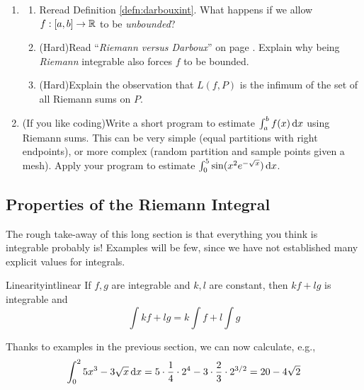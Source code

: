 \begin{exercises}
\begin{enumerate}
		\item\begin{enumerate}
		  \item Reread Definition \ref{defn:darbouxint}. What happens if we allow $f:[a,b]\to\mathbb{R}$ to be \emph{unbounded}?
		  \item (Hard)\lstsp Read ``\emph{Riemann versus Darboux}'' on page \pageref{pg:riemanndefthm}. Explain why being \emph{Riemann} integrable also forces $f$ to be bounded.
		  \item (Hard)\lstsp Explain the observation that $L(f,P)$ is the infimum of the set of all Riemann sums on $P$.
		\end{enumerate}
	
		\item (If you like coding)\quad Write a short program to estimate $\int_a^bf(x)\,{\mathrm{d} x}$ using Riemann sums. This can be very simple (equal partitions with right endpoints), or more complex (random partition and sample points given a mesh). Apply your program to estimate $\int_0^{5}\sin(x^2e^{-\sqrt x})\,{\mathrm{d} x}$.
	\end{enumerate}
\end{exercises}



\clearpage



\subsection{Properties of the Riemann Integral}\label{sec:riemannproperties}

The rough take-away of this long section is that everything you think is integrable probably is! Examples will be few, since we have not established many explicit values for integrals.


\begin{thm}{Linearity}{intlinear}
	If $f,g$ are integrable and $k,l$ are constant, then $kf+lg$ is integrable and
	\[
		\int  kf+lg=k\int f+l\int g
	\]
\end{thm}

\begin{example}{}{}
Thanks to examples in the previous section, we can now calculate, e.g.,
\[
	\int_0^25x^3-3\sqrt x\,{\mathrm{d} x}
	=5\cdot\frac 14\cdot 2^4 -3\cdot \frac 23\cdot 2^{3/2} 
	=20-4\sqrt 2
\]
\end{example}

